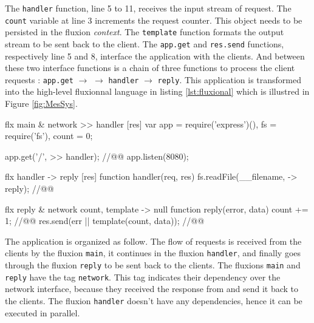 The \texttt{handler} function, line 5 to 11, receives the input stream of request.
The \texttt{count} variable at line 3 increments the request counter.
This object needs to be persisted in the fluxion \textit{context}.
The \texttt{template} function formats the output stream to be sent back to the client.
The \texttt{app.get} and \texttt{res.send} functions, respectively line 5 and 8, interface the application with the clients.
And between these two interface functions is a chain of three functions to process the client requests : \texttt{app.get} $\to$ \hspace{-1.4em} $\to$ \texttt{handler} $\to$ \texttt{reply}.
This application is transformed into the high-level fluxionnal language in listing \ref{lst:fluxional} which is illustred in Figure \ref{fig:MesSys}.


\begin{code}[flx, caption={Example application expressed in the high-level fluxional language}, label={lst:fluxional}]
flx main & network
>> handler [res]
  var app = require('express')(),
      fs = require('fs'),
      count = 0;

  app.get('/', >> handler); //@\label{lst:fluxional-streamtohandler}@
  app.listen(8080);

flx handler
-> reply [res]
  function handler(req, res) {
    fs.readFile(__filename, -> reply); //@\label{lst:fluxional-readfile}@
  }

flx reply & network {count, template}
-> null
  function reply(error, data) {
    count += 1; //@\label{lst:fluxional-counter}@
    res.send(err || template(count, data)); //@\label{lst:fluxional-ressend}@
  }
\end{code}

The application is organized as follow.
The flow of requests is received from the clients by the fluxion \texttt{main}, it continues in the fluxion \texttt{handler}, and finally goes through the fluxion \texttt{reply} to be sent back to the clients.
The fluxions \texttt{main} and \texttt{reply} have the tag \texttt{network}.
This tag indicates their dependency over the network interface, because they  received the response from and send it back to the clients.
The fluxion \texttt{handler} doesn't have any dependencies, hence it can be executed in parallel.

